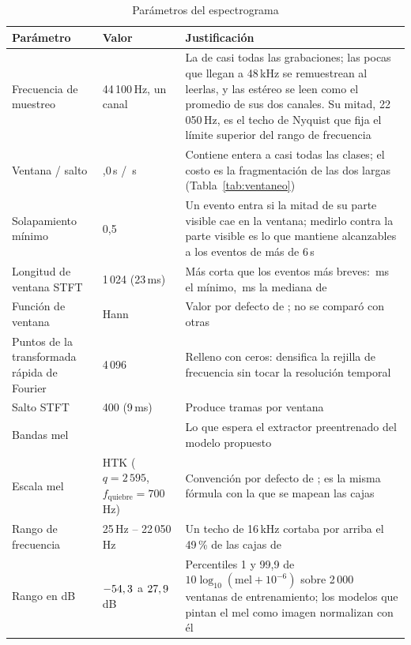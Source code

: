 \begin{table}[htbp]
    \centering
    \caption{Parámetros del espectrograma}
    \label{tab:preproc}
    \small
    \begin{tabular}{@{}L{2.6cm}L{3.0cm}L{7.9cm}@{}}
        \toprule
        \textbf{Parámetro} & \textbf{Valor} & \textbf{Justificación} \\
        \midrule
        Frecuencia de muestreo & 44\,100\,Hz, un canal & La de casi todas las grabaciones; las pocas que llegan a 48\,kHz se remuestrean al leerlas, y las estéreo se leen como el promedio de sus dos canales. Su mitad, 22\,050\,Hz, es el techo de Nyquist que fija el límite superior del rango de frecuencia \\
        \addlinespace
        Ventana / salto & \clipLen{},0\,s / \clipHop{}\,s & Contiene entera a casi todas las clases; el costo es la fragmentación de las dos largas (Tabla~\ref{tab:ventaneo}) \\
        \addlinespace
        Solapamiento mínimo & 0,5 & Un evento entra si la mitad de su parte visible cae en la ventana; medirlo contra la parte visible es lo que mantiene alcanzables a los eventos de más de 6\,s \\
        \addlinespace
        Longitud de ventana STFT & 1\,024 (23\,ms) & Más corta que los eventos más breves: \durMinMs{}\,ms el mínimo, \shortestClassMs{}\,ms la mediana de \shortestClass{} \\
        \addlinespace
        Función de ventana & Hann & Valor por defecto de ; no se comparó con otras \\
        \addlinespace
        Puntos de la transformada rápida de Fourier & 4\,096 & Relleno con ceros: densifica la rejilla de frecuencia sin tocar la resolución temporal \\
        \addlinespace
        Salto STFT & 400 (9\,ms) & Produce \nFrames{} tramas por ventana \\
        \addlinespace
        Bandas mel & \nMels{} & Lo que espera el extractor preentrenado del modelo propuesto \\
        \addlinespace
        Escala mel & HTK ($q=2\,595$,\newline $f_\text{quiebre}=700$\,Hz) & Convención por defecto de  \citep{yang_torchaudio_2022}; es la misma fórmula con la que se mapean las cajas \\
        \addlinespace
        Rango de frecuencia & 25\,Hz -- 22\,050\,Hz & Un techo de 16\,kHz cortaba por arriba el 49\,\% de las cajas de  \\
        \addlinespace
        Rango en dB & $-54,3{}$ a $27,9{}$\,dB & Percentiles 1 y 99,9 de $10\log_{10}(\text{mel}+10^{-6})$ sobre 2\,000 ventanas de entrenamiento; los modelos que pintan el mel como imagen normalizan con él \\
        \bottomrule
    \end{tabular}
\end{table}

